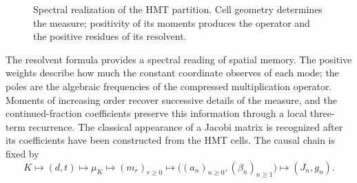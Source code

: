 \begin{figure}[htbp]
\centering
{}
\caption{Spectral realization of the HMT partition. Cell geometry
determines the measure; positivity of its moments produces the operator
and the positive residues of its resolvent.}
\label{fig:jacobi-generated}
\end{figure}

The resolvent formula provides a spectral reading of spatial memory.
The positive weights describe how much the constant coordinate observes
of each mode; the poles are the algebraic frequencies of the compressed
multiplication operator. Moments of increasing order recover successive
details of the measure, and the continued-fraction coefficients preserve
this information through a local three-term recurrence. The classical
appearance of a Jacobi matrix is recognized after its coefficients have
been constructed from the HMT cells. The causal chain is fixed by
\[
 K\longmapsto(d,t)\longmapsto\mu_K\longmapsto(m_r)_{r\geq0}
 \longmapsto\bigl((a_n)_{n\geq0},(\beta_n)_{n\geq1}\bigr)
 \longmapsto(J_n,g_n).
\]

